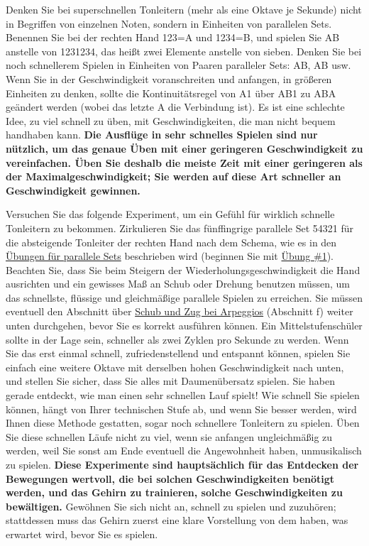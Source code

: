 Denken Sie bei superschnellen Tonleitern (mehr als eine Oktave je Sekunde) nicht in Begriffen von einzelnen Noten, sondern in Einheiten von parallelen Sets.
Benennen Sie bei der rechten Hand 123=A und 1234=B, und spielen Sie AB anstelle von 1231234, das heißt zwei Elemente anstelle von sieben.
Denken Sie bei noch schnellerem Spielen in Einheiten von Paaren paralleler Sets: AB, AB usw.
Wenn Sie in der Geschwindigkeit voranschreiten und anfangen, in größeren Einheiten zu denken, sollte die Kontinuitätsregel von A1 über AB1 zu ABA geändert werden (wobei das letzte A die Verbindung ist).
Es ist eine schlechte Idee, zu viel schnell zu üben, mit Geschwindigkeiten, die man nicht bequem handhaben kann.
\textbf{Die Ausflüge in sehr schnelles Spielen sind nur nützlich, um das genaue Üben mit einer geringeren Geschwindigkeit zu vereinfachen.
Üben Sie deshalb die meiste Zeit mit einer geringeren als der Maximalgeschwindigkeit; Sie werden auf diese Art schneller an Geschwindigkeit gewinnen.}

Versuchen Sie das folgende Experiment, um ein Gefühl für wirklich schnelle Tonleitern zu bekommen.
Zirkulieren Sie das fünffingrige parallele Set 54321 für die absteigende Tonleiter der rechten Hand nach dem Schema, wie es in den \hyperlink{c1iii7b}{Übungen für parallele Sets} beschrieben wird (beginnen Sie mit \hyperlink{c1iii7b1}{Übung \#1}).
Beachten Sie, dass Sie beim Steigern der Wiederholungsgeschwindigkeit die Hand ausrichten und ein gewisses Maß an Schub oder Drehung benutzen müssen, um das schnellste, flüssige und gleichmäßige parallele Spielen zu erreichen.
Sie müssen eventuell den Abschnitt über \hyperlink{c1iii5SchubZug}{Schub und Zug bei Arpeggios} (Abschnitt f) weiter unten durchgehen, bevor Sie es korrekt ausführen können.
Ein Mittelstufenschüler sollte in der Lage sein, schneller als zwei Zyklen pro Sekunde zu werden.
Wenn Sie das erst einmal schnell, zufriedenstellend und entspannt können, spielen Sie einfach eine weitere Oktave mit derselben hohen Geschwindigkeit nach unten, und stellen Sie sicher, dass Sie alles mit Daumenübersatz spielen.
Sie haben gerade entdeckt, wie man einen sehr schnellen Lauf spielt!
Wie schnell Sie spielen können, hängt von Ihrer technischen Stufe ab, und wenn Sie besser werden, wird Ihnen diese Methode gestatten, sogar noch schnellere Tonleitern zu spielen.
Üben Sie diese schnellen Läufe nicht zu viel, wenn sie anfangen ungleichmäßig zu werden, weil Sie sonst am Ende eventuell die Angewohnheit haben, unmusikalisch zu spielen.
\textbf{Diese Experimente sind hauptsächlich für das Entdecken der Bewegungen wertvoll, die bei solchen Geschwindigkeiten benötigt werden, und das Gehirn zu trainieren, solche Geschwindigkeiten zu bewältigen.}
Gewöhnen Sie sich nicht an, schnell zu spielen und zuzuhören; stattdessen muss das Gehirn zuerst eine klare Vorstellung von dem haben, was erwartet wird, bevor Sie es spielen.

